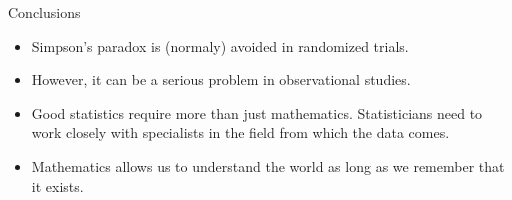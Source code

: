 \documentclass[8pt,aspectratio=169]{beamer}
\newcommand{\bs}{\vspace{\baselineskip}}
\begin{document}

\begin{frame}{Conclusions}

  \begin{itemize}

    \setlength\itemsep{2
    em}

    \item Simpson's paradox is (normaly) avoided in randomized trials.

    \item However, it can be a serious problem in observational studies.

    \item Good statistics require more than just mathematics. Statisticians
      need to work closely with specialists in the field from which the data
      comes.

    \item Mathematics allows us to understand the world as long as we remember
      that it exists.

  \end{itemize}

  \bs \bs

  \begin{center}

    \Huge


  \end{center}

\end{frame}


\begin{frame}

  \nocite{bonovas2023simpsons}
  \nocite{carbajal2021nearly}
  \nocite{charig1986comparison}
  \nocite{morris2021israeli}
  \nocite{vanwaerebeke2022voyages}
  \nocite{who2021vaccine}

  \printbibliography

\end{frame}

\end{document}
